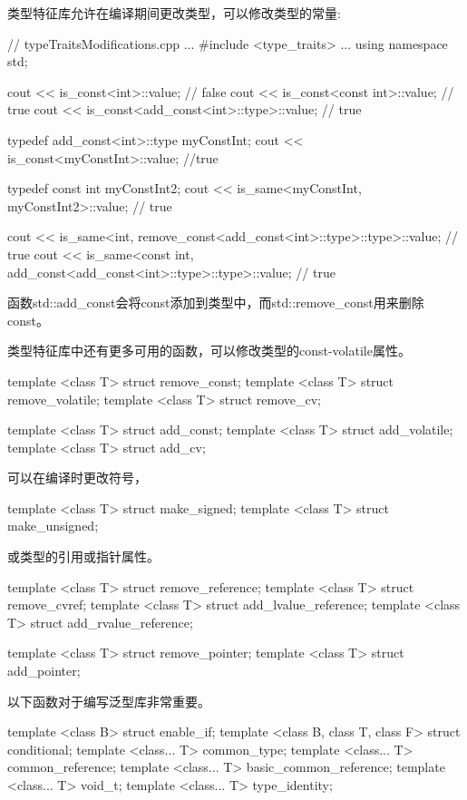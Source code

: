 
类型特征库允许在编译期间更改类型，可以修改类型的常量:


\begin{cpp}
// typeTraitsModifications.cpp
...
#include <type_traits>
...
using namespace std;

cout << is_const<int>::value; // false
cout << is_const<const int>::value; // true
cout << is_const<add_const<int>::type>::value; // true

typedef add_const<int>::type myConstInt;
cout << is_const<myConstInt>::value; //true

typedef const int myConstInt2;
cout << is_same<myConstInt, myConstInt2>::value; // true

cout << is_same<int, remove_const<add_const<int>::type>::type>::value; // true
cout << is_same<const int, add_const<add_const<int>::type>::type>::value; // true
\end{cpp}

函数std::add\_const会将const添加到类型中，而std::remove\_const用来删除const。

类型特征库中还有更多可用的函数，可以修改类型的const-volatile属性。

\begin{cpp}
template <class T> struct remove_const;
template <class T> struct remove_volatile;
template <class T> struct remove_cv;

template <class T> struct add_const;
template <class T> struct add_volatile;
template <class T> struct add_cv;
\end{cpp}

可以在编译时更改符号，

\begin{cpp}
template <class T> struct make_signed;
template <class T> struct make_unsigned;
\end{cpp}

或类型的引用或指针属性。

\begin{cpp}
template <class T> struct remove_reference;
template <class T> struct remove_cvref;
template <class T> struct add_lvalue_reference;
template <class T> struct add_rvalue_reference;

template <class T> struct remove_pointer;
template <class T> struct add_pointer;
\end{cpp}

以下函数对于编写泛型库非常重要。

\begin{cpp}
template <class B> struct enable_if;
template <class B, class T, class F> struct conditional;
template <class... T> common_type;
template <class... T> common_reference;
template <class... T> basic_common_reference;
template <class... T> void_t;
template <class... T> type_identity;
\end{cpp}

